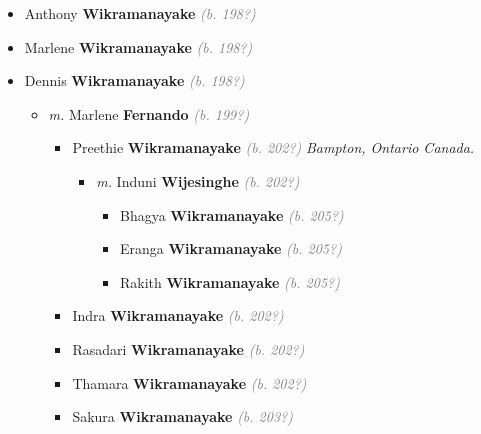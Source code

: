 \documentclass[10pt, openany]{book}
\begin{document}
\begin{itemize}
{\begin{itemize}
{\begin{itemize}
{\begin{itemize}
{\begin{itemize}
{\begin{itemize}
{ }
\item{Lahari \textbf{Wikramanayake} \textcolor{gray}{\textit{(b. 201?)}}
 }
\end{itemize}}
\end{itemize}
 }
\item{Anthony \textbf{Wikramanayake} \textcolor{gray}{\textit{(b. 198?)}}
 }
\item{Marlene \textbf{Wikramanayake} \textcolor{gray}{\textit{(b. 198?)}}
 }
\item{Dennis \textbf{Wikramanayake} \textcolor{gray}{\textit{(b. 198?)}}
\begin{itemize}
\item{\textit{m.} Marlene \textbf{Fernando} \textcolor{gray}{\textit{(b. 199?)}}   \label{couple:00004023:00004024} \begin{itemize}
\item{Preethie \textbf{Wikramanayake} \textcolor{gray}{\textit{(b. 202?)}} \textcolor{slmaroon}{\textit{Bampton, Ontario Canada.}}
\begin{itemize}
\item{\textit{m.} Induni \textbf{Wijesinghe} \textcolor{gray}{\textit{(b. 202?)}}   \label{couple:00004025:00004026} \begin{itemize}
\item{Bhagya \textbf{Wikramanayake} \textcolor{gray}{\textit{(b. 205?)}}
 }
\item{Eranga \textbf{Wikramanayake} \textcolor{gray}{\textit{(b. 205?)}}
 }
\item{Rakith \textbf{Wikramanayake} \textcolor{gray}{\textit{(b. 205?)}}
 }
\end{itemize}}
\end{itemize}
 }
\item{Indra \textbf{Wikramanayake} \textcolor{gray}{\textit{(b. 202?)}}
 }
\item{Rasadari \textbf{Wikramanayake} \textcolor{gray}{\textit{(b. 202?)}}
 }
\item{Thamara \textbf{Wikramanayake} \textcolor{gray}{\textit{(b. 202?)}}
 }
\item{Sakura \textbf{Wikramanayake} \textcolor{gray}{\textit{(b. 203?)}}
}
\end{itemize}}
\end{itemize}}
\end{itemize}}
\end{itemize}}
\end{itemize}}
\end{itemize}
\end{document}
